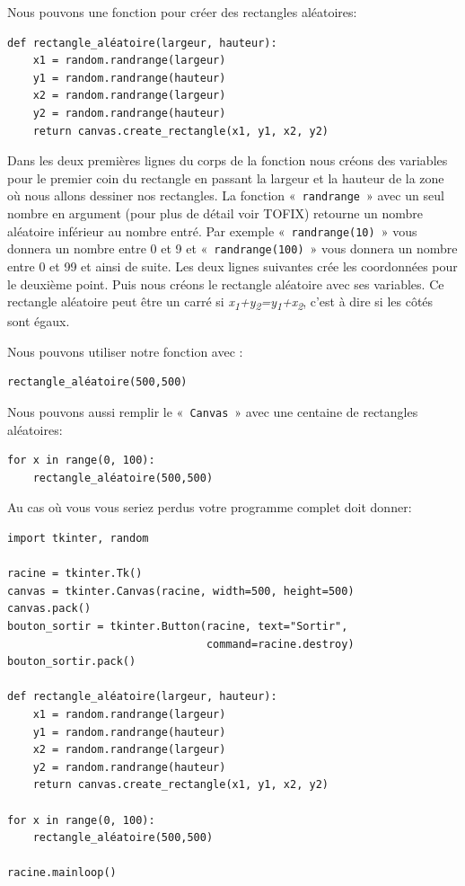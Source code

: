 Nous pouvons une fonction pour créer des rectangles aléatoires:
\begin{Verbatim}[frame=single,rulecolor=\color{mbleu}, label=à taper]
def rectangle_aléatoire(largeur, hauteur):
    x1 = random.randrange(largeur)
    y1 = random.randrange(hauteur)
    x2 = random.randrange(largeur)
    y2 = random.randrange(hauteur)
    return canvas.create_rectangle(x1, y1, x2, y2)
\end{Verbatim}

Dans les deux premières lignes du corps de la fonction nous créons des variables pour le premier coin du rectangle en passant la largeur et la hauteur de la zone où nous allons dessiner nos rectangles. 
La fonction « \texttt{randrange} » avec un seul nombre en argument (pour plus de détail voir TOFIX) retourne un nombre aléatoire inférieur au nombre entré. Par exemple « \texttt{randrange(10)} » vous donnera un nombre entre 0 et 9 et « \texttt{randrange(100)} » vous donnera un nombre entre 0 et 99 et ainsi de suite. Les deux lignes suivantes crée les coordonnées pour le deuxième point. Puis nous créons le rectangle aléatoire avec ses variables. Ce rectangle aléatoire peut être un carré si \emph{x\textsubscript{1}+y\textsubscript{2}=y\textsubscript{1}+x\textsubscript{2}}, c'est à dire si les côtés sont égaux.

Nous pouvons utiliser notre fonction avec :
\begin{Verbatim}[frame=single,rulecolor=\color{mbleu}, label=à taper]
rectangle_aléatoire(500,500)
\end{Verbatim}

Nous pouvons aussi remplir le « \texttt{Canvas} » avec une centaine de rectangles aléatoires:
\begin{Verbatim}[frame=single,rulecolor=\color{mbleu}, label=à taper]
for x in range(0, 100):
    rectangle_aléatoire(500,500)
\end{Verbatim}

Au cas où vous vous seriez perdus votre programme complet doit donner:

\begin{Verbatim}[frame=single,rulecolor=\color{mbleu}, label=à taper]
import tkinter, random

racine = tkinter.Tk()
canvas = tkinter.Canvas(racine, width=500, height=500)
canvas.pack()
bouton_sortir = tkinter.Button(racine, text="Sortir",
                               command=racine.destroy)
bouton_sortir.pack()

def rectangle_aléatoire(largeur, hauteur):
    x1 = random.randrange(largeur)
    y1 = random.randrange(hauteur)
    x2 = random.randrange(largeur)
    y2 = random.randrange(hauteur)
    return canvas.create_rectangle(x1, y1, x2, y2)

for x in range(0, 100):
    rectangle_aléatoire(500,500)

racine.mainloop()
\end{Verbatim}

